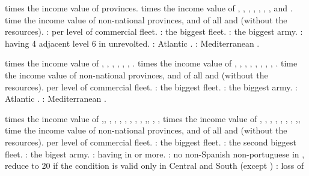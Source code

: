  times the income value of  provinces.
 times the income value of ,
, , ,
, , ,
and .
 time the income value of non-national provinces, and of all \COL and
\TP (without the resources).
 \VPs: 
 \VP per level of commercial fleet.
 \VPs: the biggest fleet.
 \VPs: the biggest army.
 \VPs: having 4 adjacent level 6 \COL in 
unrevolted.
 \VPs: Atlantic .
 \VPs: Mediterranean .

 times the income value of ,
, , ,
, , .
 times the income value of ,
, , ,
, ,
, ,
.
 time the income value of non-national provinces, and of all \COL and
\TP (without the resources).
 \VP per level of commercial fleet.
 \VPs: the biggest fleet.
 \VPs: the biggest army.
 \VPs: Atlantic .
 \VPs: Mediterranean .

 times the income value of
,,
, , ,
, , ,
,
,, ,
, 
 times the income value of ,
, , ,
, , ,
,, 
 time the income value of non-national provinces, and of all \COL and
\TP (without the resources).
 \VP per level of commercial fleet.
 \VPs: the biggest fleet.
 \VPs: the second biggest fleet.
 \VPs: the bigest army.
 \VPs: having  in \AM or more.
 \VPs: no non-Spanish non-portuguese \COL in ,
reduce to 20 \VP if the condition is valid only in Central and South
 (except )
 \VPs: loss of 

